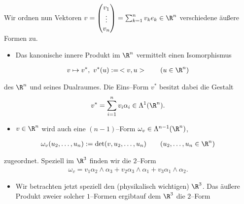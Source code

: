 \begin{example}{}{}



\par
Wir ordnen nun Vektoren
\(v = \begin{pmatrix} v_1\\ \vdots\\ v_n \end{pmatrix} =\sum_{k=1}^nv_ke_k\in\R^n\) verschiedene äußere Formen zu.
\begin{itemize}
\item {} 
\par
Das kanonische innere Produkt im \(\R^n\) vermittelt einen Isomorphismus

\end{itemize}
\begin{align*}
v\mapsto v^*,\ v^*(u) :=\, < v,u > \qquad(u\in\R^n)
\end{align*}
\par
des \(\R^n\) und seines Dualraumes. Die Eins–Form \(v^*\) besitzt dabei die Gestalt
\begin{align*}
v^* = \sum_{i=1}^nv_i\alpha_i
\in\Lambda^1(\R^n).
\end{align*}\begin{itemize}
\item {} 
\par
\(v\in\R^n\) wird auch eine \((n-1)\)–Form \(\omega_v\in\Lambda^{n-1}(\R^n)\),

\end{itemize}
\begin{align*}
\omega_v(u_2,\ldots,u_n) := \det(v,u_2,\ldots,u_n) \qquad (u_2,\ldots,u_n\in\R^n)
\end{align*}
\par
zugeordnet. Speziell im \(\R^3\) finden wir die \(2\)–Form
\begin{align*}
\omega_v = v_1\alpha_2\wedge\alpha_3+v_2\alpha_3\wedge\alpha_1+v_3
\alpha_1\wedge\alpha_2.
\end{align*}\begin{itemize}
\item {} 
\par
Wir betrachten jetzt speziell den (physikalisch wichtigen) \(\R^3\).
Das äußere Produkt zweier solcher \(1\)–Formen ergibtauf dem \(\R^3\) die \(2\)–Form


\end{itemize}
\end{example}
